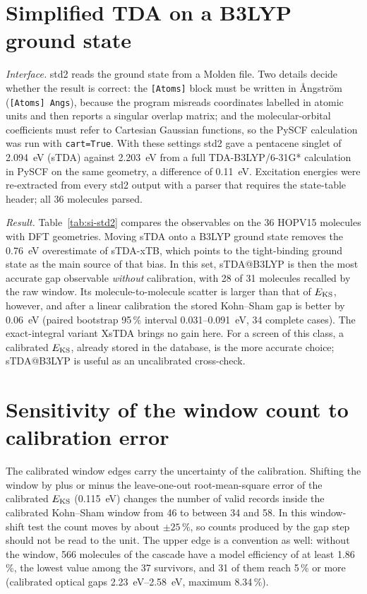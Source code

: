 \documentclass[11pt]{article}
\begin{document}
\section{Simplified TDA on a B3LYP ground state}\label{sec:std2}
\textit{Interface.} std2 reads the ground state from a Molden file. Two details decide whether the result is correct:
the \texttt{[Atoms]} block must be written in \AA ngstr\"om (\texttt{[Atoms] Angs}), because the program misreads
coordinates labelled in atomic units and then reports a singular overlap matrix; and the molecular-orbital coefficients
must refer to Cartesian Gaussian functions, so the PySCF calculation was run with \texttt{cart=True}. With these settings
std2 gave a pentacene singlet of \qty{2.094}{eV} (sTDA) against \qty{2.203}{eV} from a full TDA-B3LYP/6-31G* calculation
in PySCF on the same geometry, a difference of \qty{0.11}{eV}. Excitation energies were re-extracted from every std2 output with a parser that requires the state-table
header; all 36 molecules parsed.

\textit{Result.} Table~\ref{tab:si-std2} compares the observables on the 36 HOPV15 molecules with DFT geometries.
Moving sTDA onto a B3LYP ground state removes the \qty{0.76}{eV} overestimate of sTDA-xTB, which points to the
tight-binding ground state as the main source of that bias. In this set, sTDA@B3LYP is then the most accurate gap
observable \emph{without} calibration, with 28 of 31 molecules recalled by the raw window. Its molecule-to-molecule
scatter is larger than that of $E_{\mathrm{KS}}$, however, and after a linear calibration the stored Kohn--Sham gap is better by
\qty{0.06}{eV} (paired bootstrap 95\,\% interval 0.031--\qty{0.091}{eV}, 34 complete cases). The exact-integral variant
XsTDA brings no gain here. For a screen of this class, a calibrated $E_{\mathrm{KS}}$, already stored in the database, is the more
accurate choice; sTDA@B3LYP is useful as an uncalibrated cross-check.


\section{Sensitivity of the window count to calibration error}
The calibrated window edges carry the uncertainty of the calibration. Shifting the window by plus or minus the
leave-one-out root-mean-square error of the calibrated $E_{\mathrm{KS}}$ (\qty{0.115}{eV}) changes the number of valid records
inside the calibrated Kohn--Sham window from 46 to between 34 and 58. In this window-shift test the count moves by about
$\pm 25\,\%$, so counts produced by the gap step should not be read to the unit.
The upper edge is a convention as well: without the window, 566 molecules of the cascade have a model efficiency of at least 1.86\,\%, the lowest value among the 37 survivors, and 31 of them reach 5\,\% or more (calibrated optical gaps \qtyrange{2.23}{2.58}{eV}, maximum 8.34\,\%).
\end{document}
